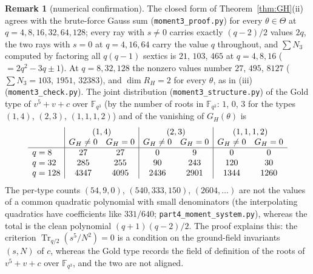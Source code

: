 \documentclass[12pt,a4paper]{amsart}
\theoremstyle{definition}
\newtheorem{remark}[theorem]{Remark}
\newcommand{\F}{\mathbb{F}}
\newcommand{\Tr}{\operatorname{Tr}}
\begin{document}
\begin{remark}[numerical confirmation]\label{rem:N3numerics}
The closed form of Theorem~\ref{thm:GH}(ii) agrees with the brute-force Gauss sum (\texttt{moment3\_proof.py}) for every $\theta\in\Theta$ at $q=4,8,16,32,64,128$; every ray with $s\ne0$ carries exactly $(q-2)/2$ values $2q$, the two rays with $s=0$ at $q=4,16,64$ carry the value $q$ throughout, and $\sum N_3$ computed by factoring all $q(q-1)$ sextics is $21$, $103$, $465$ at $q=4,8,16$ ($=2q^2-3q\pm1$). At $q=8,32,128$ the nonzero values number $27$, $495$, $8127$ ($\sum N_3=103$, $1951$, $32383$), and $\dim R_H=2$ for every $\theta$, as in (iii) (\texttt{moment3\_check.py}). The joint distribution (\texttt{moment3\_structure.py}) of the Gold type of $v^5+v+c$ over $\F_{q^3}$ (by the number of roots in $\F_{q^3}$: $1$, $0$, $3$ for the types $(1,4)$, $(2,3)$, $(1,1,1,2)$) and of the vanishing of $G_H(\theta)$ is
\[
\begin{array}{l|cc|cc|cc}
 & \multicolumn{2}{c|}{(1,4)} & \multicolumn{2}{c|}{(2,3)} & \multicolumn{2}{c}{(1,1,1,2)}\\
 & G_H\ne0 & G_H=0 & G_H\ne0 & G_H=0 & G_H\ne0 & G_H=0\\
\hline
q=8 & 27 & 27 & 0 & 9 & 0 & 0\\
q=32 & 285 & 255 & 90 & 243 & 120 & 30\\
q=128 & 4347 & 4095 & 2436 & 2901 & 1344 & 1260
\end{array}
\]
The per-type counts $(54,9,0)$, $(540,333,150)$, $(2604,\dots)$ are not the values of a common quadratic polynomial with small denominators (the interpolating quadratics have coefficients like $331/640$; \texttt{part4\_moment\_system.py}), whereas the total is the clean polynomial $(q+1)(q-2)/2$. The proof explains this: the criterion $\Tr_{q/2}(s^5/N^2)=0$ is a condition on the ground-field invariants $(s,N)$ of $c$, whereas the Gold type records the field of definition of the roots of $v^5+v+c$ over $\F_{q^3}$, and the two are not aligned.
\end{remark}
\end{document}
